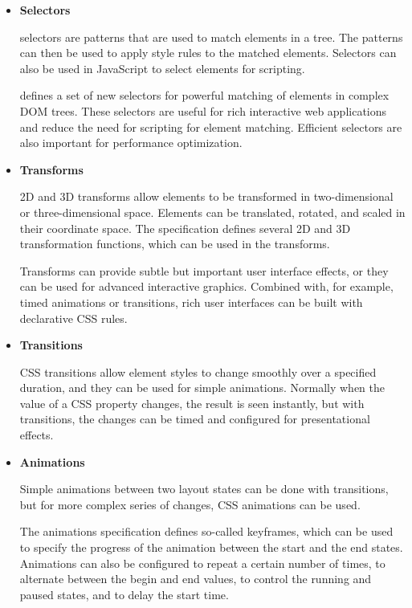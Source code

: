 \begin{itemize}

\item \textbf{Selectors}

   selectors are patterns that are used to match elements in
  a  tree. The patterns can then be used to apply style
  rules to the matched elements. Selectors can also be used in
  JavaScript to select elements for scripting.

   defines a set of new selectors \cite{CSS3Selectors} for
  powerful matching of elements in complex DOM trees. These selectors
  are useful for rich interactive web applications and reduce the need
  for scripting for element matching. Efficient selectors are also
  important for performance optimization.

\item \textbf{Transforms}

  2D and 3D transforms \cite{CSStransforms} allow elements to be
  transformed in two-dimensional or three-dimensional space. Elements
  can be translated, rotated, and scaled in their coordinate
  space. The specification defines several 2D and 3D transformation
  functions, which can be used in the transforms.

  Transforms can provide subtle but important user interface effects,
  or they can be used for advanced interactive graphics. Combined
  with, for example, timed animations or transitions, rich user
  interfaces can be built with declarative CSS rules.

\item \textbf{Transitions}

  CSS transitions \cite{CSStransitions} allow element styles to change
  smoothly over a specified duration, and they can be used for simple
  animations. Normally when the value of a CSS property changes, the
  result is seen instantly, but with transitions, the changes can be
  timed and configured for presentational effects.

\item \textbf{Animations}

  Simple animations between two layout states can be done with
  transitions, but for more complex series of changes, CSS animations
  \cite{CSSanimations} can be used.

  The animations specification defines so-called keyframes, which can
  be used to specify the progress of the animation between the start
  and the end states. Animations can also be configured to repeat a
  certain number of times, to alternate between the begin and end
  values, to control the running and paused states, and to delay the
  start time. \cite{CSSanimations}


\end{itemize}
